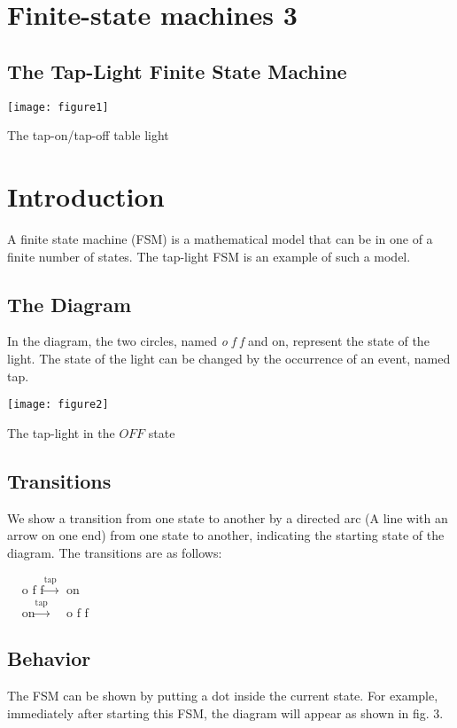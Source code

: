 \documentclass{article}
\begin{document}
\section{Finite-state machines 3}

\subsection{The Tap-Light Finite State Machine}

\begin{center}
\texttt{[image: figure1]}
\caption{The tap-on/tap-off table light}
\label{fig:tap-light}
\end{center}

\section{Introduction}
A finite state machine (FSM) is a mathematical model that can be in one of a finite number of states. The tap-light FSM is an example of such a model.

\subsection{The Diagram}
In the diagram, the two circles, named \emph{o f f} and on, represent the state of the light. The state of the light can be changed by the occurrence of an event, named tap.

\begin{center}
  \texttt{[image: figure2]}
  \caption{The tap-light in the $O F F$ state}
  \label{fig:tap-light-fff}
\end{center}

\subsection{Transitions}
We show a transition from one state to another by a directed arc (A line with an arrow on one end) from one state to another, indicating the starting state of the diagram. The transitions are as follows:

$\begin{array}{rll} & \text{o f f}\xrightarrow{\text{tap}}&\text{on}\\ &\text{on}\xrightarrow{\text{tap}}&\text{o f f}\end{array}$

\subsection{Behavior}
The FSM can be shown by putting a dot inside the current state. For example, immediately after starting this FSM, the diagram will appear as shown in fig. 3.
\end{document}

